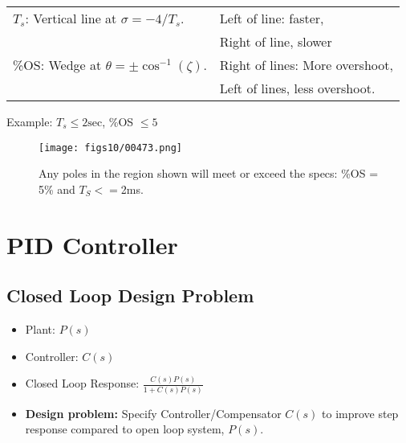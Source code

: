 \begin{tabular}{ll}
$T_s$:  Vertical line at $\sigma = -4/T_s$.     &
Left of line:   faster,  \\ & Right of line, slower
\\
\%OS:  Wedge at $\theta= \pm \cos^{-1}(\zeta)$.  &
Right of lines:  More overshoot, \\ & Left of lines, less overshoot.
\end{tabular}


 
Example: $T_s \leq 2\mathrm{sec}$, \%OS $\leq 5$%


\begin{figure}\centering
\texttt{[image: figs10/00473.png]}
\caption{Any poles in the region shown will meet or exceed the specs: \%OS = 5\% and $T_S<=$2ms.}\label{splaneregion}
\end{figure}







\section{PID Controller}
\subsection{Closed Loop Design Problem} 

\begin{itemize}

	\item Plant: $P(s)$

	\item Controller: $C(s)$

	\item Closed Loop Response:   $\frac{C(s)P(s)}{1 + C(s)P(s)}$

	\item {\bf Design problem: }
           Specify Controller/Compensator $C(s)$ to improve step response compared to open loop system, $P(s)$.
\end{itemize} 
 



